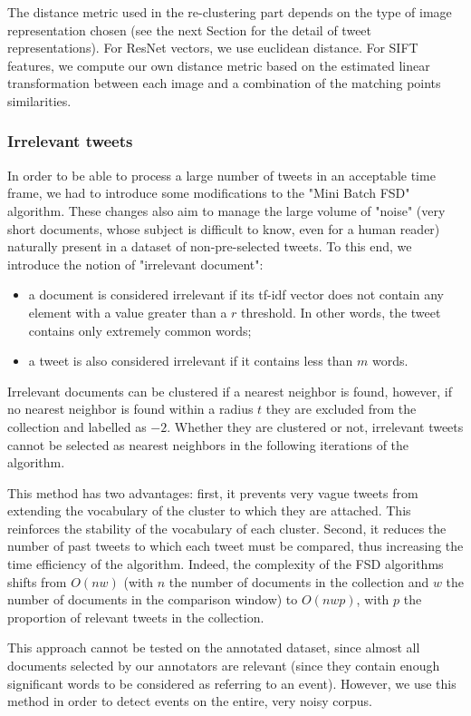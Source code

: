 The distance metric used in the re-clustering part depends on the type of image representation chosen (see the next Section for the detail of tweet representations). For ResNet vectors, we use euclidean distance. For SIFT features, we compute our own distance metric based on the estimated linear transformation between each image and a combination of the matching points similarities.

\subsubsection{Irrelevant tweets}
In order to be able to process a large number of tweets in an acceptable time frame, we had to introduce some modifications to the "Mini Batch FSD" algorithm. These changes also aim to manage the large volume of "noise" (very short documents, whose subject is difficult to know, even for a human reader) naturally present in a dataset of non-pre-selected tweets. To this end, we introduce the notion of "irrelevant document":
\begin{itemize}
    \item a document is considered irrelevant if its tf-idf vector does not contain any element with a value greater than a $r$ threshold. In other words, the tweet contains only extremely common words;
    \item  a tweet is also considered irrelevant if it contains less than $m$ words. 
\end{itemize}
Irrelevant documents can be clustered if a nearest neighbor is found, however, if no nearest neighbor is found within a radius $t$ they are excluded from the collection and labelled as $-2$. Whether they are clustered or not, irrelevant tweets cannot be selected as nearest neighbors in the following iterations of the algorithm. 

This method has two advantages: first, it prevents very vague tweets from extending the vocabulary of the cluster to which they are attached. This reinforces the stability of the vocabulary of each cluster. Second, it reduces the number of past tweets to which each tweet must be compared, thus increasing the time efficiency of the algorithm. Indeed, the complexity of the FSD algorithms shifts from $O(nw)$ (with $n$ the number of documents in the collection and $w$ the number of documents in the comparison window) to $O(nwp)$, with $p$ the proportion of relevant tweets in the collection. 

This approach cannot be tested on the annotated dataset, since almost all documents selected by our annotators are relevant (since they contain enough significant words to be considered as referring to an event). However, we use this method in order to detect events on the entire, very noisy corpus.

